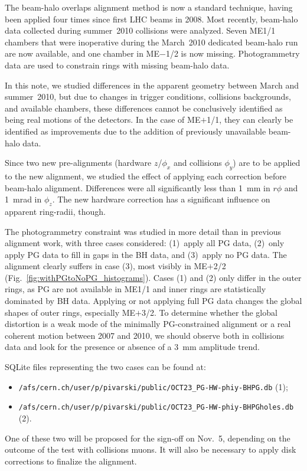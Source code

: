 \documentclass[12pt]{article}
\begin{document}
The beam-halo overlaps alignment method is now a standard technique,
having been applied four times since first LHC beams in 2008.  Most
recently, beam-halo data collected during summer~2010 collisions were
analyzed.  Seven ME1/1 chambers that were inoperative during the
March~2010 dedicated beam-halo run are now available, and one chamber
in ME$-$1/2 is now missing.  Photogrammetry data are used to constrain
rings with missing beam-halo data.

In this note, we studied differences in the apparent geometry between
March and summer~2010, but due to changes in trigger conditions,
collisions backgrounds, and available chambers, these differences
cannot be conclusively identified as being real motions of the
detectors.  In the case of ME$+$1/1, they can clearly be identified as
improvements due to the addition of previously unavailable beam-halo data.

Since two new pre-alignments (hardware $z$/$\phi_x$ and collisions
$\phi_y$) are to be applied to the new alignment, we studied the
effect of applying each correction before beam-halo alignment.
Differences were all significantly less than 1~mm in $r\phi$ and
1~mrad in $\phi_z$.  The new hardware correction has a significant
influence on apparent ring-radii, though.

The photogrammetry constraint was studied in more detail than in
previous alignment work, with three cases considered: (1)~apply all PG
data, (2)~only apply PG data to fill in gaps in the BH data, and
(3)~apply no PG data.  The alignment clearly suffers in case (3), most
visibly in ME$+$2/2 (Fig.~\ref{fig:withPGtoNoPG_histograms}).  Cases
(1) and (2) only differ in the outer rings, as PG are not available in
ME1/1 and inner rings are statistically dominated by BH data.
Applying or not applying full PG data changes the global shapes of
outer rings, especially ME$+$3/2.  To determine whether the global
distortion is a weak mode of the minimally PG-constrained alignment
or a real coherent motion between 2007 and 2010, we should observe
both in collisions data and look for the presence or absence of a 3~mm
amplitude trend.

SQLite files representing the two cases can be found at:
\begin{itemize}
\item {\tt /afs/cern.ch/user/p/pivarski/public/OCT23\_PG-HW-phiy-BHPG.db} (1);
\item {\tt /afs/cern.ch/user/p/pivarski/public/OCT23\_PG-HW-phiy-BHPGholes.db} (2).
\end{itemize}
One of these two will be proposed for the sign-off on Nov.~5,
depending on the outcome of the test with collisions muons.  It will
also be necessary to apply disk corrections to finalize the alignment.
\end{document}
